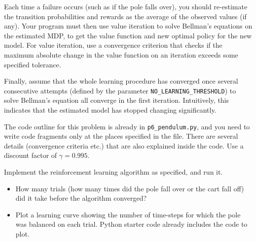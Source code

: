   Each time a failure occurs (such as if the pole falls over), you should 
  re-estimate the transition probabilities and rewards as the average of 
  the observed values (if any).  Your program must then use value iteration 
  to solve Bellman's equations on the estimated MDP, to get the value function 
  and new optimal policy for the new model.  For value iteration, use a 
  convergence criterion that checks if the maximum absolute change in the 
  value function on an iteration exceeds some specified tolerance. 

  Finally, assume that the whole learning procedure has converged 
  once several consecutive attempts (defined by the parameter 
  {\tt NO\_LEARNING\_THRESHOLD}) to solve Bellman's
  equation all converge in the first iteration. Intuitively, this
  indicates that the estimated model has stopped changing significantly.

  The code outline for this problem is already in 
  {\tt p6\_pendulum.py}, and you need to write code fragments only at the
  places specified in the file. There are several details (convergence criteria
  etc.) that are also explained inside the code. Use a discount factor
  of $\gamma = 0.995$.  

  Implement the reinforcement learning algorithm as specified, and run it.

\begin{itemize}
\item  How many trials (how many times did the pole fall over or the cart fall off) 
  did it take before the algorithm converged?


\item  Plot a learning curve showing the number of time-steps for which the
  pole was balanced on each trial. Python starter code already includes the code to plot.

\end{itemize}

\ifnum{} {
  
} \fi
